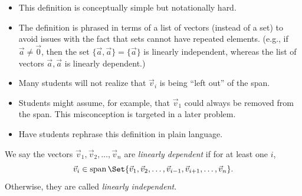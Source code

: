 \documentclass{problemset}
\DeclareMathOperator{\Span}{span}
\begin{document}
	\begin{annotation}
		\begin{goals}
		\end{goals}

		\begin{notes}
			\begin{itemize}
				\item This definition is conceptually simple but notationally hard.
				\item The definition is phrased in terms of a list of vectors (instead of
					a set) to avoid issues with the fact that sets cannot have repeated elements. (e.g.,
					if $\vec a\neq \vec 0$, then the set $\{\vec a,\vec a\}=\{\vec a\}$ is linearly
					independent, whereas the list of vectors $\vec a,\vec a$ is linearly dependent.)
				\item Many students will not realize that $\vec v_i$ is being ``left out''
					of the span.
				\item Students might assume, for example, that $\vec v_1$ could always be removed
					from the span. This misconception is targeted in a later problem.
				\item Have students rephrase this definition in plain language.
			\end{itemize}
		\end{notes}
	\end{annotation}
	\begin{definition}
		We say the vectors $\vec v_1,\vec v_2,\ldots,\vec v_n$ are
		\emph{linearly dependent} if for at least one $i$,
		\[
			\vec v_i\in\Span\Set{\vec v_1,\vec v_2,\ldots,\vec v_{i-1},
			\vec v_{i+1},\ldots,\vec v_n}.
		\]
		Otherwise, they are called \emph{linearly independent}.
	\end{definition}
\end{document}
